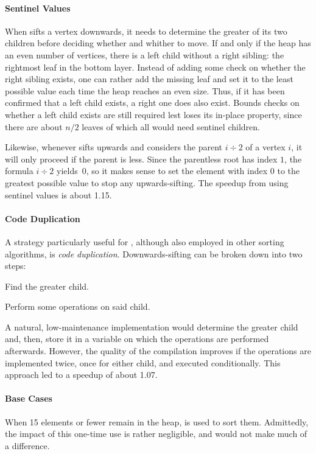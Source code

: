 \paragraph{Sentinel Values}
When \HS{} sifts a vertex downwards, it needs to determine the greater of its two children before deciding whether and whither to move.
If and only if the heap has an even number of vertices, there is a left child without a right sibling:
the rightmost leaf in the bottom layer.
Instead of adding some check on whether the right sibling exists, one can rather add the missing leaf and set it to the least possible value each time the heap reaches an even size.
Thus, if it has been confirmed that a left child exists, a right one does also exist.
Bounds checks on whether a left child exists are still required lest \HS{} loses its in-place property, since there are about \(n/2\) leaves of which all would need sentinel children.

Likewise, whenever \HS{} sifts upwards and considers the parent \(i \div 2\) of a vertex \(i\), it will only proceed if the parent is less.
Since the parentless root has index \(1\), the formula \(i \div 2\) yields~\(0\), so it makes sense to set the element with index \(0\) to the greatest possible value to stop any upwards-sifting.
The speedup from using sentinel values is about \num{1.15}.


\paragraph{Code Duplication}
A strategy particularly useful for \HS{}, although also employed in other sorting algorithms, is \emph{code duplication}.
Downwards-sifting can be broken down into two steps:
\begin{enumerate*}
	\item
	Find the greater child.

	\item
	Perform some operations on said child.
\end{enumerate*}
A natural, low-maintenance implementation would determine the greater child and, then, store it in a variable on which the operations are performed afterwards.
However, the quality of the compilation improves if the operations are implemented twice, once for either child, and executed conditionally.
This approach led to a speedup of about \num{1.07}.


\paragraph{Base Cases}
When 15 elements or fewer remain in the heap, \IS{} is used to sort them.
Admittedly, the impact of this one-time use is rather negligible, and \ShS{} would not make much of a difference.
